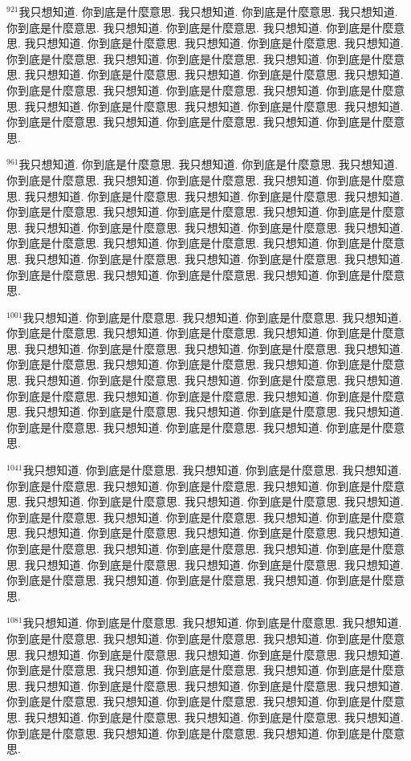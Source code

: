 \documentclass{book}
\begin{document}
$^{921}$我只想知道.
你到底是什麼意思.
我只想知道.
你到底是什麼意思.
我只想知道.
你到底是什麼意思.
我只想知道.
你到底是什麼意思.
我只想知道.
你到底是什麼意思.
我只想知道.
你到底是什麼意思.
我只想知道.
你到底是什麼意思.
我只想知道.
你到底是什麼意思.
我只想知道.
你到底是什麼意思.
我只想知道.
你到底是什麼意思.
我只想知道.
你到底是什麼意思.
我只想知道.
你到底是什麼意思.
我只想知道.
你到底是什麼意思.
我只想知道.
你到底是什麼意思.
我只想知道.
你到底是什麼意思.
我只想知道.
你到底是什麼意思.
我只想知道.
你到底是什麼意思.
我只想知道.
你到底是什麼意思.
我只想知道.
你到底是什麼意思.
我只想知道.
你到底是什麼意思.

$^{961}$我只想知道.
你到底是什麼意思.
我只想知道.
你到底是什麼意思.
我只想知道.
你到底是什麼意思.
我只想知道.
你到底是什麼意思.
我只想知道.
你到底是什麼意思.
我只想知道.
你到底是什麼意思.
我只想知道.
你到底是什麼意思.
我只想知道.
你到底是什麼意思.
我只想知道.
你到底是什麼意思.
我只想知道.
你到底是什麼意思.
我只想知道.
你到底是什麼意思.
我只想知道.
你到底是什麼意思.
我只想知道.
你到底是什麼意思.
我只想知道.
你到底是什麼意思.
我只想知道.
你到底是什麼意思.
我只想知道.
你到底是什麼意思.
我只想知道.
你到底是什麼意思.
我只想知道.
你到底是什麼意思.
我只想知道.
你到底是什麼意思.
我只想知道.
你到底是什麼意思.

$^{1001}$我只想知道.
你到底是什麼意思.
我只想知道.
你到底是什麼意思.
我只想知道.
你到底是什麼意思.
我只想知道.
你到底是什麼意思.
我只想知道.
你到底是什麼意思.
我只想知道.
你到底是什麼意思.
我只想知道.
你到底是什麼意思.
我只想知道.
你到底是什麼意思.
我只想知道.
你到底是什麼意思.
我只想知道.
你到底是什麼意思.
我只想知道.
你到底是什麼意思.
我只想知道.
你到底是什麼意思.
我只想知道.
你到底是什麼意思.
我只想知道.
你到底是什麼意思.
我只想知道.
你到底是什麼意思.
我只想知道.
你到底是什麼意思.
我只想知道.
你到底是什麼意思.
我只想知道.
你到底是什麼意思.
我只想知道.
你到底是什麼意思.
我只想知道.
你到底是什麼意思.

$^{1041}$我只想知道.
你到底是什麼意思.
我只想知道.
你到底是什麼意思.
我只想知道.
你到底是什麼意思.
我只想知道.
你到底是什麼意思.
我只想知道.
你到底是什麼意思.
我只想知道.
你到底是什麼意思.
我只想知道.
你到底是什麼意思.
我只想知道.
你到底是什麼意思.
我只想知道.
你到底是什麼意思.
我只想知道.
你到底是什麼意思.
我只想知道.
你到底是什麼意思.
我只想知道.
你到底是什麼意思.
我只想知道.
你到底是什麼意思.
我只想知道.
你到底是什麼意思.
我只想知道.
你到底是什麼意思.
我只想知道.
你到底是什麼意思.
我只想知道.
你到底是什麼意思.
我只想知道.
你到底是什麼意思.
我只想知道.
你到底是什麼意思.
我只想知道.
你到底是什麼意思.

$^{1081}$我只想知道.
你到底是什麼意思.
我只想知道.
你到底是什麼意思.
我只想知道.
你到底是什麼意思.
我只想知道.
你到底是什麼意思.
我只想知道.
你到底是什麼意思.
我只想知道.
你到底是什麼意思.
我只想知道.
你到底是什麼意思.
我只想知道.
你到底是什麼意思.
我只想知道.
你到底是什麼意思.
我只想知道.
你到底是什麼意思.
我只想知道.
你到底是什麼意思.
我只想知道.
你到底是什麼意思.
我只想知道.
你到底是什麼意思.
我只想知道.
你到底是什麼意思.
我只想知道.
你到底是什麼意思.
我只想知道.
你到底是什麼意思.
我只想知道.
你到底是什麼意思.
我只想知道.
你到底是什麼意思.
我只想知道.
你到底是什麼意思.
我只想知道.
你到底是什麼意思.
\end{document}

